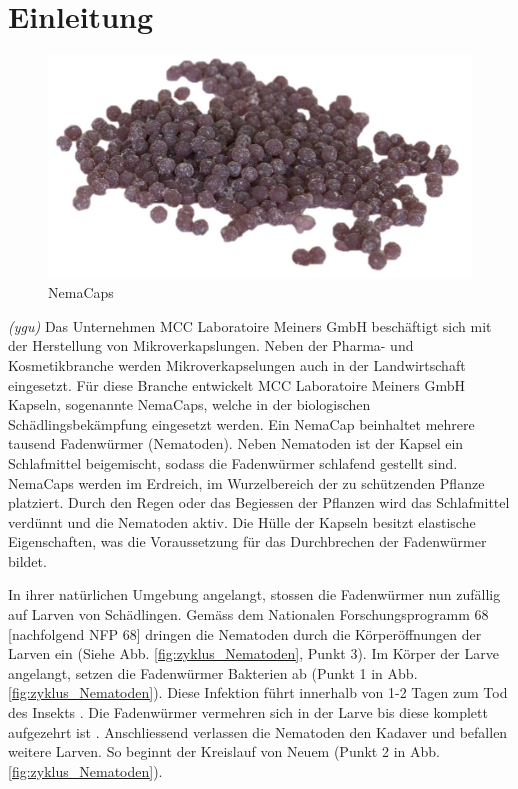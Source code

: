 \newpage
\section{Einleitung}
\begin{figure}
	\includegraphics[draft=false,scale=0.4]{Illustrationen/3-Einleitung/nemacaps_1.jpg}
	\caption{NemaCaps}
	\label{fig:nemacaps}
\end{figure}
\textit{(ygu)} Das Unternehmen MCC Laboratoire Meiners GmbH beschäftigt sich mit der Herstellung von Mikroverkapslungen. Neben der Pharma- und Kosmetikbranche werden Mikroverkapselungen auch in der Landwirtschaft eingesetzt. Für diese Branche entwickelt MCC Laboratoire Meiners GmbH Kapseln, sogenannte NemaCaps, welche in der biologischen Schädlingsbekämpfung eingesetzt werden. Ein NemaCap beinhaltet mehrere tausend Fadenwürmer (Nematoden). Neben Nematoden ist der Kapsel ein Schlafmittel beigemischt, sodass die Fadenwürmer schlafend gestellt sind. NemaCaps werden im Erdreich, im Wurzelbereich der zu schützenden Pflanze platziert. Durch den Regen oder das Begiessen der Pflanzen wird das Schlafmittel verdünnt und die Nematoden aktiv. Die Hülle der Kapseln besitzt elastische Eigenschaften, was die Voraussetzung für das Durchbrechen der Fadenwürmer bildet. 
\newline

In ihrer natürlichen Umgebung angelangt, stossen die Fadenwürmer nun zufällig auf Larven von Schädlingen. Gemäss dem Nationalen Forschungsprogramm 68 [nachfolgend NFP 68]\cite{nfp} dringen die Nematoden durch die Körperöffnungen der Larven ein (Siehe Abb.  \ref{fig:zyklus_Nematoden}, Punkt 3). Im Körper der Larve angelangt, setzen die Fadenwürmer Bakterien ab (Punkt 1 in Abb.  \ref{fig:zyklus_Nematoden}). Diese Infektion führt innerhalb von 1-2 Tagen zum Tod des Insekts \cite{e-nema}. Die Fadenwürmer vermehren sich in der Larve bis diese komplett aufgezehrt ist \cite{nematoden}. Anschliessend verlassen die Nematoden den Kadaver und befallen weitere Larven. So beginnt der Kreislauf von Neuem (Punkt 2 in Abb.  \ref{fig:zyklus_Nematoden}).
\newline

